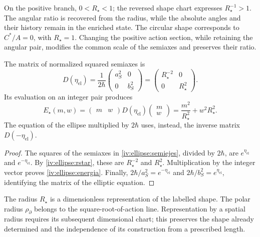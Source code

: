 On the positive branch, \(0<R_\star<1\); the reversed shape chart
expresses \(R_\star^{-1}>1\). The angular ratio
is recovered from the radius, while the absolute angles
and their history remain in the enriched state.
The circular shape corresponds to \(C^*/A=0\), with
\(R_\star=1\). Changing the positive action section,
while retaining the angular pair, modifies the common scale of
the semiaxes and preserves their ratio.

\begin{proposition}
\label{iv:ellipse:matriz-prop}
The matrix of normalized squared semiaxes is
\begin{equation}
 D(\eta_{\mathrm{el}})
 =\frac1{2\hbar}
    \begin{pmatrix}a_S^2&0\\0&b_S^2\end{pmatrix}
 =\begin{pmatrix}R_\star^{-2}&0\\0&R_\star^2\end{pmatrix}.
 \label{iv:ellipse:matriz}
\end{equation}
Its evaluation on an integer pair produces
\begin{equation}
 E_\star(m,w)=
 \begin{pmatrix}m&w\end{pmatrix}
 D(\eta_{\mathrm{el}})
 \begin{pmatrix}m\\w\end{pmatrix}
 =\frac{m^2}{R_\star^2}+w^2R_\star^2.
 \label{iv:ellipse:energia}
\end{equation}
The equation of the ellipse multiplied by \(2\hbar\)
uses, instead, the inverse matrix \(D(-\eta_{\mathrm{el}})\).
\end{proposition}
\begin{proof}
The squares of the semiaxes in
\eqref{iv:ellipse:semiejes}, divided by \(2\hbar\),
are \(e^{\eta_{\mathrm{el}}}\) and
\(e^{-\eta_{\mathrm{el}}}\).
By \eqref{iv:ellipse:rstar}, these are
\(R_\star^{-2}\) and \(R_\star^2\).
Multiplication by the integer vector proves
\eqref{iv:ellipse:energia}. Finally,
\(2\hbar/a_S^2=e^{-\eta_{\mathrm{el}}}\) and
\(2\hbar/b_S^2=e^{\eta_{\mathrm{el}}}\), identifying
the matrix of the elliptic equation.
\end{proof}

The radius \(R_\star\) is a dimensionless representation of
the labelled shape. The polar radius
\(\rho_{\partial}\) belongs to the square-root-of-action line.
Representation by a spatial radius requires its subsequent
dimensional chart; this preserves the shape already determined
and the independence of its construction from a
prescribed length.
